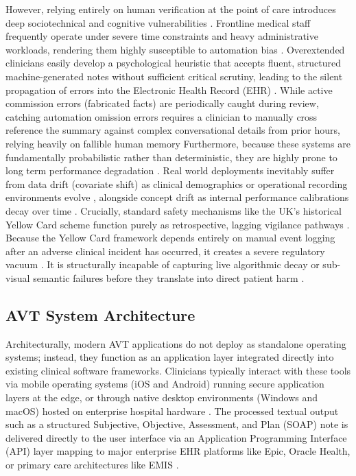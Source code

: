 \documentclass[11pt,a4paper]{article}
\begin{document}
However, relying entirely on human verification at the point of care introduces deep sociotechnical and cognitive vulnerabilities \cite{mhra2021} . Frontline medical staff frequently operate under severe time constraints and heavy administrative workloads, rendering them highly susceptible to automation bias \cite{parasuraman2010complacency} \cite{vention2026UKhealthcare} . Overextended clinicians easily develop a psychological heuristic that accepts fluent, structured machine-generated notes without sufficient critical scrutiny, leading to the silent propagation of errors into the Electronic Health Record (EHR) \cite{vention2026UKhealthcare} \cite{guan2026} . While active commission errors (fabricated facts) are periodically caught during review, catching automation omission errors requires a clinician to manually cross reference the summary against complex conversational details from prior hours, relying heavily on fallible human memory \cite{oUKelmoun2025}
Furthermore, because these systems are fundamentally probabilistic rather than deterministic, they are highly prone to long term performance degradation \cite{guan2026} . Real world deployments inevitably suffer from data drift (covariate shift) as clinical demographics or operational recording environments evolve \cite{kothari2019} , alongside concept drift as internal performance calibrations decay over time \cite{guan2026} . Crucially, standard safety mechanisms like the UK's historical Yellow Card scheme function purely as retrospective, lagging vigilance pathways \cite{greener2017} . Because the Yellow Card framework depends entirely on manual event logging after an adverse clinical incident has occurred, it creates a severe regulatory vacuum \cite{vanoyen2026} . It is structurally incapable of capturing live algorithmic decay or sub-visual semantic failures before they translate into direct patient harm \cite{guan2026} .

\subsection{AVT System Architecture}
\label{sec:AVT System Architecture}

Architecturally, modern AVT applications do not deploy as standalone operating systems; instead, they function as an application layer integrated directly into existing clinical software frameworks. Clinicians typically interact with these tools via mobile operating systems (iOS and Android) running secure application layers at the edge, or through native desktop environments (Windows and macOS) hosted on enterprise hospital hardware \cite{heidihealth2026safety} . The processed textual output such as a structured Subjective, Objective, Assessment, and Plan (SOAP) note is delivered directly to the user interface via an Application Programming Interface (API) layer mapping to major enterprise EHR platforms like Epic, Oracle Health, or primary care architectures like EMIS \cite{sUKi2026guide} .
\end{document}

